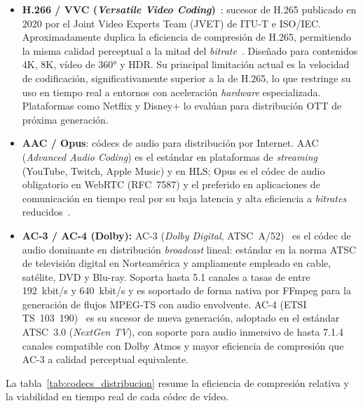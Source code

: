 \begin{itemize}
  \item \textbf{H.266 / VVC (\textit{Versatile Video Coding})}~\cite{itu_h266}: sucesor
  de H.265 publicado en 2020 por el Joint Video Experts Team (JVET) de \ac{ITU-T} e
  ISO/IEC. Aproximadamente duplica la eficiencia de compresión de H.265, permitiendo
  la misma calidad perceptual a la mitad del \textit{bitrate}~\cite{chen2024_codec_comparison}.
  Diseñado para contenidos 4K, 8K, vídeo de 360° y \ac{HDR}. Su principal limitación actual
  es la velocidad de codificación, significativamente superior a la de H.265, lo que
  restringe su uso en tiempo real a entornos con aceleración \textit{hardware} especializada.
  Plataformas como Netflix y Disney$+$ lo evalúan para distribución \acs{OTT} de próxima
  generación.

  \item \textbf{AAC / Opus}: códecs de audio para distribución por Internet. AAC
  (\textit{Advanced Audio Coding}) es el estándar en plataformas de
  \textit{streaming} (YouTube, Twitch, Apple Music) y en HLS; Opus es el códec de
  audio obligatorio en WebRTC (RFC~7587) y el preferido en aplicaciones de
  comunicación en tiempo real por su baja latencia y alta eficiencia a \textit{bitrates}
  reducidos~\cite{rfc7587}.

  \item \textbf{AC-3 / AC-4 (Dolby):} AC-3 (\textit{Dolby Digital},
  ATSC~A/52)~\cite{atsc_a52} es el códec de audio dominante en distribución \textit{broadcast}
  lineal: estándar en la norma ATSC de televisión digital en Norteamérica y ampliamente
  empleado en cable, satélite, DVD y Blu-ray. Soporta hasta 5.1 canales a tasas de
  entre 192~kbit/s y 640~kbit/s y es soportado de forma nativa por FFmpeg para la generación
  de flujos MPEG-TS con audio envolvente. AC-4 (ETSI TS~103~190)~\cite{etsi_ac4} es su
  sucesor de nueva generación, adoptado en el estándar ATSC~3.0 (\textit{NextGen TV}),
  con soporte para audio inmersivo de hasta 7.1.4 canales compatible con Dolby Atmos y
  mayor eficiencia de compresión que AC-3 a calidad perceptual equivalente.

\end{itemize}

La tabla~\ref{tab:codecs_distribucion} resume la eficiencia de compresión relativa
y la viabilidad en tiempo real de cada códec de vídeo.

